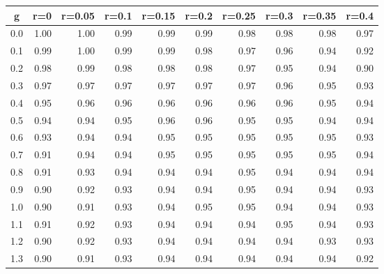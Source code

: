 %
\begin{table}[!tbp]
 \begin{center}
 \begin{tabular}{rrrrrrrrrr}\hline\hline
\multicolumn{1}{c}{g}&\multicolumn{1}{c}{r=0}&\multicolumn{1}{c}{r=0.05}&\multicolumn{1}{c}{r=0.1}&\multicolumn{1}{c}{r=0.15}&\multicolumn{1}{c}{r=0.2}&\multicolumn{1}{c}{r=0.25}&\multicolumn{1}{c}{r=0.3}&\multicolumn{1}{c}{r=0.35}&\multicolumn{1}{c}{r=0.4}\tabularnewline
\hline
0.0&1.00&1.00&0.99&0.99&0.99&0.98&0.98&0.98&0.97\tabularnewline
0.1&0.99&1.00&0.99&0.99&0.98&0.97&0.96&0.94&0.92\tabularnewline
0.2&0.98&0.99&0.98&0.98&0.98&0.97&0.95&0.94&0.90\tabularnewline
0.3&0.97&0.97&0.97&0.97&0.97&0.97&0.96&0.95&0.93\tabularnewline
0.4&0.95&0.96&0.96&0.96&0.96&0.96&0.96&0.95&0.94\tabularnewline
0.5&0.94&0.94&0.95&0.96&0.96&0.95&0.95&0.94&0.94\tabularnewline
0.6&0.93&0.94&0.94&0.95&0.95&0.95&0.95&0.95&0.93\tabularnewline
0.7&0.91&0.94&0.94&0.95&0.95&0.95&0.95&0.95&0.94\tabularnewline
0.8&0.91&0.93&0.94&0.94&0.94&0.95&0.94&0.94&0.94\tabularnewline
0.9&0.90&0.92&0.93&0.94&0.94&0.95&0.94&0.94&0.93\tabularnewline
1.0&0.90&0.91&0.93&0.94&0.95&0.95&0.94&0.94&0.93\tabularnewline
1.1&0.91&0.92&0.93&0.94&0.94&0.94&0.95&0.94&0.93\tabularnewline
1.2&0.90&0.92&0.93&0.94&0.94&0.94&0.94&0.93&0.93\tabularnewline
1.3&0.90&0.91&0.93&0.94&0.94&0.94&0.94&0.94&0.92\tabularnewline
\hline
\end{tabular}

\end{center}

\end{table}

